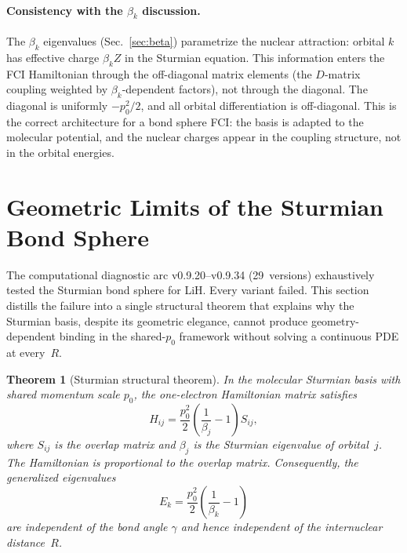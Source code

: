 \documentclass[aps,pra,twocolumn,superscriptaddress,longbibliography]{revtex4-2}
\newtheorem{theorem}{Theorem}
\begin{document}
\paragraph{Consistency with the $\beta_k$ discussion.}
The $\beta_k$ eigenvalues (Sec.~\ref{sec:beta}) parametrize the
nuclear attraction: orbital $k$ has effective charge $\beta_k Z$
in the Sturmian equation.  This information enters the FCI Hamiltonian
through the off-diagonal matrix elements (the $D$-matrix coupling
weighted by $\beta_k$-dependent factors), not through the diagonal.
The diagonal is uniformly $-p_0^2/2$, and all orbital differentiation
is off-diagonal.  This is the correct architecture for a bond sphere
FCI: the basis is adapted to the molecular potential, and the nuclear
charges appear in the coupling structure, not in the orbital energies.


\section{Geometric Limits of the Sturmian Bond Sphere}
\label{sec:structural_theorem}

The computational diagnostic arc v0.9.20--v0.9.34 (29~versions) exhaustively
tested the Sturmian bond sphere for LiH.  Every variant failed.  This section
distills the failure into a single structural theorem that explains why the
Sturmian basis, despite its geometric elegance, cannot produce
geometry-dependent binding in the shared-$p_0$ framework without solving a
continuous PDE at every~$R$.

\begin{theorem}[Sturmian structural theorem]
\label{thm:structural}
In the molecular Sturmian basis with shared momentum scale $p_0$,
the one-electron Hamiltonian matrix satisfies
\begin{equation}
H_{ij} = \frac{p_0^2}{2}\!\left(\frac{1}{\beta_j} - 1\right) S_{ij},
\label{eq:H_prop_S}
\end{equation}
where $S_{ij}$ is the overlap matrix and $\beta_j$ is the Sturmian
eigenvalue of orbital~$j$.  The Hamiltonian is proportional to the overlap
matrix.  Consequently, the generalized eigenvalues
\begin{equation}
E_k = \frac{p_0^2}{2}\!\left(\frac{1}{\beta_k} - 1\right)
\label{eq:E_geom_indep}
\end{equation}
are independent of the bond angle $\gamma$ and hence independent of the
internuclear distance~$R$.
\end{theorem}
\end{document}
